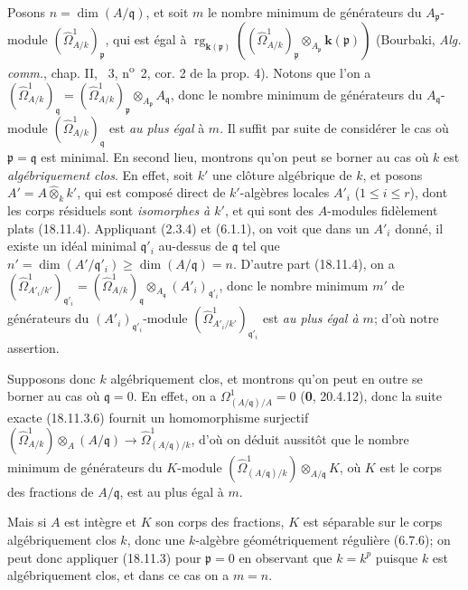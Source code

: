Posons $n=\dim(A/\mathfrak q)$, et soit $m$ le nombre minimum de générateurs du $A_{\mathfrak p}$-module $(\hat{\Omega}^1_{A/k})_{\mathfrak p}$, qui est égal à $\operatorname{rg}_{\mathbf{k}(\mathfrak p)}((\hat{\Omega}^1_{A/k})_{\mathfrak p}\otimes_{A_{\mathfrak p}}\boldsymbol{k}(\mathfrak p))$ (Bourbaki, \emph{Alg. comm.}, chap. II, \textsection~3, n\textsuperscript{o}~2, cor. 2 de la prop. 4). Notons que l'on a $(\hat{\Omega}^1_{A/k})_{\mathfrak q}=(\hat{\Omega}^1_{A/k})_{\mathfrak p}\otimes_{A_{\mathfrak p}}A_{\mathfrak q}$, donc le nombre minimum de générateurs du $A_{\mathfrak q}$-module $(\hat{\Omega}^1_{A/k})_{\mathfrak q}$ est \emph{au plus égal} à $m$. Il suffit par suite de considérer le cas où $\mathfrak p=\mathfrak q$ est minimal. En second lieu, montrons qu'on peut se borner au cas où $k$ est \emph{algébriquement clos}. En effet, soit $k'$ une clôture algébrique de $k$, et posons $A'=A\widehat{\otimes}_k k'$, qui est composé direct de $k'$-algèbres locales $A'_i$ ($1\leq i\leq r$), dont les corps résiduels sont \emph{isomorphes à $k'$}, et qui sont des $A$-modules fidèlement plats (18.11.4). Appliquant (2.3.4) et (6.1.1), on voit que dans un $A'_i$ donné, il existe un idéal minimal $\mathfrak q'_i$ au-dessus de $\mathfrak q$ tel que $n'=\dim(A'/\mathfrak q'_i)\geq\dim(A/\mathfrak q)=n$. D'autre part (18.11.4), on a $(\hat{\Omega}^1_{A'_i/k'})_{\mathfrak q'_i}=(\hat{\Omega}^1_{A/k})_{\mathfrak q}\otimes_{A_{\mathfrak q}}(A'_i)_{\mathfrak q'_i}$, donc le nombre minimum $m'$ de générateurs du $(A'_i)_{\mathfrak q'_i}$-module $(\hat{\Omega}^1_{A'_i/k'})_{\mathfrak q'_i}$ est \emph{au plus égal à $m$}; d'où notre assertion.

Supposons donc $k$ algébriquement clos, et montrons qu'on peut en outre se borner au cas où $\mathfrak q=0$. En effet, on a $\Omega^1_{(A/\mathfrak q)/A}=0$ (\textbf{0}, 20.4.12), donc la suite exacte (18.11.3.6) fournit un homomorphisme surjectif $(\hat{\Omega}^1_{A/k})\otimes_A(A/\mathfrak q)\to\hat{\Omega}^1_{(A/\mathfrak q)/k}$, d'où on déduit aussitôt que le nombre minimum de générateurs du $K$-module $(\hat{\Omega}^1_{(A/\mathfrak q)/k})\otimes_{A/\mathfrak q}K$, où $K$ est le corps des fractions de $A/\mathfrak q$, est au plus égal à $m$.

Mais si $A$ est intègre et $K$ son corps des fractions, $K$ est séparable sur le corps algébriquement clos $k$, donc une $k$-algèbre géométriquement régulière (6.7.6); on peut donc appliquer (18.11.3) pour $\mathfrak p=0$ en observant que $k=k^p$ puisque $k$ est algébriquement clos, et dans ce cas on a $m=n$.

